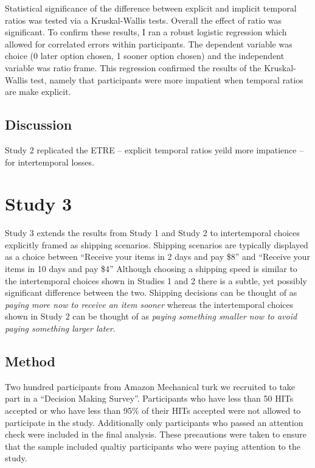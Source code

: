 \documentclass[]{article}
\begin{document}
Statistical significance of  the difference between explicit and implicit temporal ratios was tested via a Kruskal-Wallis tests.
Overall the effect of ratio was significant. 
To confirm these results, I ran a robust logistic regression which allowed for correlated errors within participants.
The dependent variable was choice (0 later option chosen, 1 sooner option chosen) and the independent variable was ratio frame. 
This regression confirmed the results of the Kruskal-Wallis test, namely that participants were more impatient when temporal ratios are make explicit. 

\subsection{Discussion}

Study 2 replicated the ETRE -- explicit temporal ratios yeild more impatience -- for intertemporal losses. 


\section{Study 3}
Study 3 extends the results from Study 1 and Study 2 to intertemporal choices explicitly framed as shipping scenarios.
Shipping scenarios are typically displayed as a choice between ``Receive your items in 2 days and pay \$8'' and ``Receive your items in 10 days and pay \$4''
Although choosing a shipping speed is similar to the intertemporal choices shown in Studies 1 and 2 there is a subtle, yet possibly significant difference between the two.
Shipping decisions can be thought of as \textit{paying more now to receive an item sooner} whereas the intertemporal choices shown in Study 2 can be thought of as \textit{paying something smaller now to avoid paying something larger later}.

\subsection{Method}
Two hundred participants from Amazon Mechanical turk we recruited to take part in a ``Decision Making Survey''. 
Participants who have less than 50 HITs accepted or  who have less than 95\% of their HITs accepted were not allowed to participate in the study. 
Additionally only participants who passed an attention check were included in the final analysis.
These precautions were taken to ensure that the sample included qualtiy participants who were paying attention to the study. 
\end{document}
